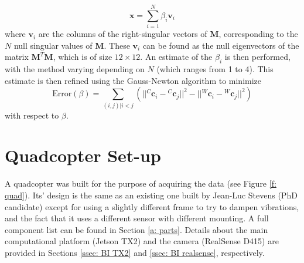 \documentclass[12pt,a4paper]{article}
\begin{document}
    \[
    \textbf{x} = \sum^N_{i=1} \beta_i \textbf{v}_i
    \]
    where $\textbf{v}_i$ are the columns of the right-singular vectors of $\textbf{M}$, corresponding to the $N$ null singular values of $\textbf{M}$. These $\textbf{v}_i$ can be found as the null eigenvectors of the matrix $\textbf{M}^T\textbf{M}$, which is of size $12 \times 12$. An estimate of the $\beta_i$ is then performed, with the method varying depending on $N$ (which ranges from 1 to 4). This estimate is then refined using the Gauss-Newton algorithm to minimize \cite{lepetit2009epnp}
    \[
    \text{Error}(\beta) = \sum_{(i,j) | i<j} \left(||{}^C\textbf{c}_i - {}^C\textbf{c}_j||^2 -  ||{}^W\textbf{c}_i - {}^W\textbf{c}_j||^2\right)
    \]
    with respect to $\beta$.


\section{Quadcopter Set-up}
  \label{sec: quad set-up}
  A quadcopter was built for the purpose of acquiring the data (see Figure \ref{f: quad}). Its' design is the same as an existing one built by Jean-Luc Stevens (PhD candidate) except for using a slightly different frame to try to dampen vibrations, and the fact that it uses a different sensor with different mounting. A full component list can be found in Section \ref{a: parts}. Details about the main computational platform (Jetson TX2) and the camera (RealSense D415) are provided in Sections \ref{ssec: BI TX2} and \ref{ssec: BI realsense}, respectively. \\
\end{document}
